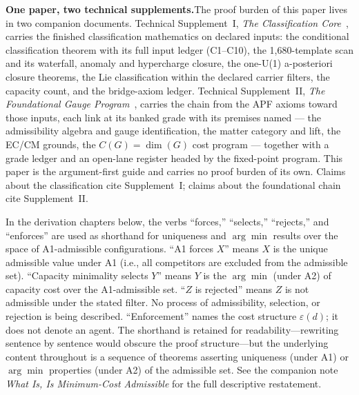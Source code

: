 \documentclass[11pt]{article}
\begin{document}
\medskip\noindent\textbf{One paper, two technical supplements.}\quad The proof burden of this paper lives in two companion documents.  Technical Supplement~I, \emph{The Classification Core}~\cite{BrookeP2Supplement}, carries the finished classification mathematics on declared inputs: the conditional classification theorem with its full input ledger (C1--C10), the 1{,}680-template scan and its waterfall, anomaly and hypercharge closure, the one-U(1) a-posteriori closure theorems, the Lie classification within the declared carrier filters, the capacity count, and the bridge-axiom ledger.  Technical Supplement~II, \emph{The Foundational Gauge Program}~\cite{BrookeP2FoundSupplement}, carries the chain from the APF axioms toward those inputs, each link at its banked grade with its premises named --- the admissibility algebra and gauge identification, the matter category and lift, the EC/CM grounds, the $C(G) = \dim(G)$ cost program --- together with a grade ledger and an open-lane register headed by the fixed-point program.  This paper is the argument-first guide and carries no proof burden of its own.  Claims about the classification cite Supplement~I; claims about the foundational chain cite Supplement~II.



\begin{tcolorbox}[apfbox, title={Descriptive-framing convention (read once, applies throughout)}]
In the derivation chapters below, the verbs ``forces,'' ``selects,'' ``rejects,'' and ``enforces'' are used as shorthand for uniqueness and $\arg\min$ results over the space of A1-admissible configurations.  ``A1 forces $X$'' means $X$ is the unique admissible value under A1 (i.e., all competitors are excluded from the admissible set).  ``Capacity minimality selects $Y$'' means $Y$ is the $\arg\min$ (under A2) of capacity cost over the A1-admissible set.  ``$Z$ is rejected'' means $Z$ is not admissible under the stated filter.  No process of admissibility, selection, or rejection is being described.  ``Enforcement'' names the cost structure $\varepsilon(d)$; it does not denote an agent.  The shorthand is retained for readability---rewriting sentence by sentence would obscure the proof structure---but the underlying content throughout is a sequence of theorems asserting uniqueness (under A1) or $\arg\min$ properties (under A2) of the admissible set.  See the companion note \emph{What Is, Is Minimum-Cost Admissible} for the full descriptive restatement.
\end{tcolorbox}
\end{document}
